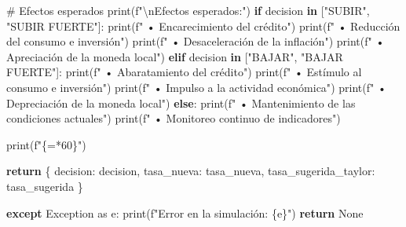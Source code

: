 \documentclass[
  doc,
  floatsintext,
  longtable,
  a4paper,
  nolmodern,
  notxfonts,
  notimes,
  12pt,
  colorlinks=true,linkcolor=blue,citecolor=blue,urlcolor=blue]{apa7}
\newenvironment{Shaded}{\begin{snugshade}}{\end{snugshade}}
\newcommand{\BuiltInTok}[1]{\textcolor[rgb]{0.00,0.23,0.31}{#1}}
\newcommand{\CharTok}[1]{\textcolor[rgb]{0.13,0.47,0.30}{#1}}
\newcommand{\CommentTok}[1]{\textcolor[rgb]{0.37,0.37,0.37}{#1}}
\newcommand{\ControlFlowTok}[1]{\textcolor[rgb]{0.00,0.23,0.31}{\textbf{#1}}}
\newcommand{\DecValTok}[1]{\textcolor[rgb]{0.68,0.00,0.00}{#1}}
\newcommand{\ImportTok}[1]{\textcolor[rgb]{0.00,0.46,0.62}{#1}}
\newcommand{\KeywordTok}[1]{\textcolor[rgb]{0.00,0.23,0.31}{\textbf{#1}}}
\newcommand{\NormalTok}[1]{\textcolor[rgb]{0.00,0.23,0.31}{#1}}
\newcommand{\OperatorTok}[1]{\textcolor[rgb]{0.37,0.37,0.37}{#1}}
\newcommand{\PreprocessorTok}[1]{\textcolor[rgb]{0.68,0.00,0.00}{#1}}
\newcommand{\SpecialCharTok}[1]{\textcolor[rgb]{0.37,0.37,0.37}{#1}}
\newcommand{\SpecialStringTok}[1]{\textcolor[rgb]{0.13,0.47,0.30}{#1}}
\newcommand{\StringTok}[1]{\textcolor[rgb]{0.13,0.47,0.30}{#1}}
\newcommand{\VariableTok}[1]{\textcolor[rgb]{0.07,0.07,0.07}{#1}}
\begin{document}
\begin{Shaded}
\begin{Highlighting}[]
        \CommentTok{\# Efectos esperados}
        \BuiltInTok{print}\NormalTok{(}\SpecialStringTok{f"}\CharTok{\textbackslash{}n}\SpecialStringTok{Efectos esperados:"}\NormalTok{)}
        \ControlFlowTok{if}\NormalTok{ decision }\KeywordTok{in}\NormalTok{ [}\StringTok{"SUBIR"}\NormalTok{, }\StringTok{"SUBIR FUERTE"}\NormalTok{]:}
            \BuiltInTok{print}\NormalTok{(}\SpecialStringTok{f"  • Encarecimiento del crédito"}\NormalTok{)}
            \BuiltInTok{print}\NormalTok{(}\SpecialStringTok{f"  • Reducción del consumo e inversión"}\NormalTok{)}
            \BuiltInTok{print}\NormalTok{(}\SpecialStringTok{f"  • Desaceleración de la inflación"}\NormalTok{)}
            \BuiltInTok{print}\NormalTok{(}\SpecialStringTok{f"  • Apreciación de la moneda local"}\NormalTok{)}
        \ControlFlowTok{elif}\NormalTok{ decision }\KeywordTok{in}\NormalTok{ [}\StringTok{"BAJAR"}\NormalTok{, }\StringTok{"BAJAR FUERTE"}\NormalTok{]:}
            \BuiltInTok{print}\NormalTok{(}\SpecialStringTok{f"  • Abaratamiento del crédito"}\NormalTok{)}
            \BuiltInTok{print}\NormalTok{(}\SpecialStringTok{f"  • Estímulo al consumo e inversión"}\NormalTok{)}
            \BuiltInTok{print}\NormalTok{(}\SpecialStringTok{f"  • Impulso a la actividad económica"}\NormalTok{)}
            \BuiltInTok{print}\NormalTok{(}\SpecialStringTok{f"  • Depreciación de la moneda local"}\NormalTok{)}
        \ControlFlowTok{else}\NormalTok{:}
            \BuiltInTok{print}\NormalTok{(}\SpecialStringTok{f"  • Mantenimiento de las condiciones actuales"}\NormalTok{)}
            \BuiltInTok{print}\NormalTok{(}\SpecialStringTok{f"  • Monitoreo continuo de indicadores"}\NormalTok{)}
        
        \BuiltInTok{print}\NormalTok{(}\SpecialStringTok{f"}\SpecialCharTok{\{}\StringTok{\textquotesingle{}=\textquotesingle{}}\OperatorTok{*}\DecValTok{60}\SpecialCharTok{\}}\SpecialStringTok{"}\NormalTok{)}
        
        \ControlFlowTok{return}\NormalTok{ \{}
            \StringTok{\textquotesingle{}decision\textquotesingle{}}\NormalTok{: decision,}
            \StringTok{\textquotesingle{}tasa\_nueva\textquotesingle{}}\NormalTok{: tasa\_nueva,}
            \StringTok{\textquotesingle{}tasa\_sugerida\_taylor\textquotesingle{}}\NormalTok{: tasa\_sugerida}
\NormalTok{        \}}
        
    \ControlFlowTok{except} \PreprocessorTok{Exception} \ImportTok{as}\NormalTok{ e:}
        \BuiltInTok{print}\NormalTok{(}\SpecialStringTok{f"Error en la simulación: }\SpecialCharTok{\{}\NormalTok{e}\SpecialCharTok{\}}\SpecialStringTok{"}\NormalTok{)}
        \ControlFlowTok{return} \VariableTok{None}


\end{Highlighting}
\end{Shaded}
\end{document}
